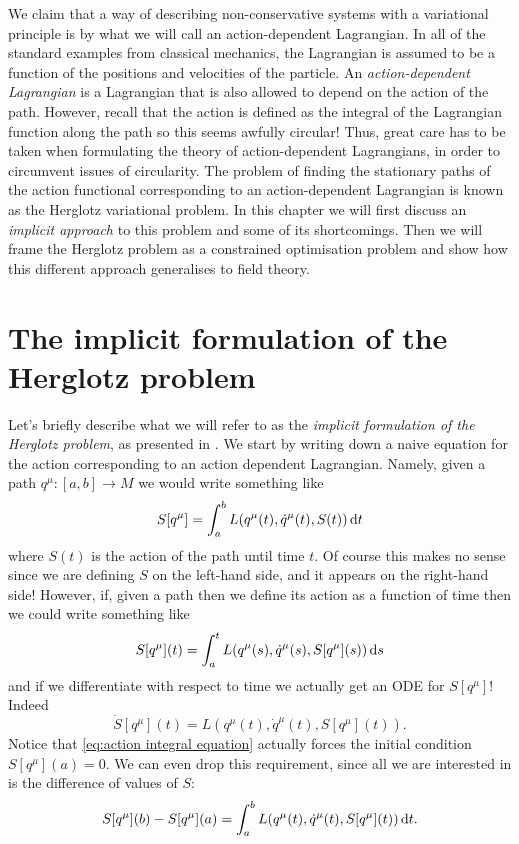 \documentclass[../main.tex]{subfiles}
\begin{document}
We claim that a way of describing non-conservative systems with a variational principle is
by what we will call an action-dependent Lagrangian. In all of the standard examples from
classical mechanics, the Lagrangian is assumed to be a function of the positions and
velocities of the particle. An \emph{action-dependent Lagrangian} is a Lagrangian that is
also allowed to depend on the action of the path. However, recall that the action is
defined as the integral of the Lagrangian function along the path so this seems awfully
circular! Thus, great care has to be taken when formulating the theory of action-dependent
Lagrangians, in order to circumvent issues of circularity. The problem of finding the
stationary paths of the action functional corresponding to an action-dependent Lagrangian
is known as the Herglotz variational problem. In this chapter we will first discuss an
\emph{implicit approach} to this problem and some of its shortcomings. Then we will
frame the Herglotz problem as a constrained optimisation problem and show how this
different approach generalises to field theory. 

\section{The implicit formulation of the Herglotz problem}
Let's briefly describe what we will refer to as the \emph{implicit formulation of the
Herglotz problem}, as presented in \cite{Lazo2018}. We start by writing down a naive
equation for the action corresponding to an action dependent Lagrangian. Namely, given a
path \( q^\mu \colon [a,b] \to M \) we would write something like
\begin{equation*}
	S[q^\mu] = \int_a^b L(q^\mu(t), \dot{q}^\mu(t), S(t)) \,\mathrm{d} t
\end{equation*}
where \( S(t) \) is the action of the path until time \( t \). Of course this makes no
sense since we are defining \( S \) on the left-hand side, and it appears on the
right-hand side! However, if, given a path then we define its action as a function of time
then we could write something like
\begin{equation}\label{eq:action integral equation}
	S[q^\mu](t) = \int_a^t L(q^\mu(s), \dot{q}^\mu(s), S[q^\mu](s)) \,\mathrm{d} s
\end{equation}
and if we differentiate with respect to time we actually get an ODE for \( S[q^\mu] \)!
Indeed
\begin{equation} \label{eq:action ode}
	\dot{S}[q^\mu](t) = L(q^\mu(t), \dot{q}^\mu(t), S[q^\mu](t)).
\end{equation}
Notice that \cref{eq:action integral equation} actually forces the initial condition \(
S[q^\mu](a) = 0 \). We can even drop this requirement, since all we are interested in is
the difference of values of \( S \):
\begin{equation}\label{eq:action density 1d}
	S[q^\mu](b) - S[q^\mu](a) = \int_a^b L(q^\mu(t), \dot{q}^\mu(t), S[q^\mu](t)) \,\mathrm{d} t. 
\end{equation}
\end{document}
